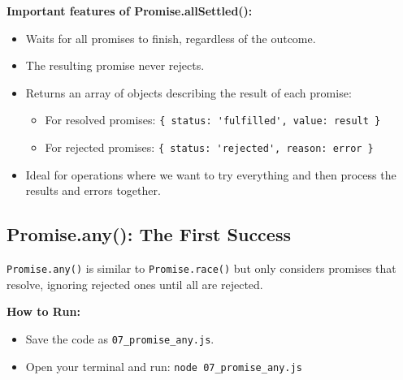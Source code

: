 \documentclass[12pt,letterpaper]{article}
\begin{document}
\textbf{Important features of Promise.allSettled():}
\begin{itemize}
    \item Waits for all promises to finish, regardless of the outcome.
    \item The resulting promise never rejects.
    \item Returns an array of objects describing the result of each promise:
    \begin{itemize}
        \item For resolved promises: \verb|{ status: 'fulfilled', value: result }|
        \item For rejected promises: \verb|{ status: 'rejected', reason: error }|
    \end{itemize}
    \item Ideal for operations where we want to try everything and then process the results and errors together.
\end{itemize}

\subsection{Promise.any(): The First Success}

\texttt{\textcolor{accentColor}{Promise.any()}} is similar to \texttt{\textcolor{accentColor}{Promise.race()}} but only considers promises that resolve, ignoring rejected ones until all are rejected.

\textbf{How to Run:}
\begin{itemize}
    \item Save the code as \verb|07_promise_any.js|.
    \item Open your terminal and run: \verb|node 07_promise_any.js|
\end{itemize}
\end{document}
